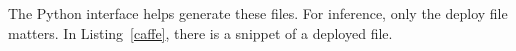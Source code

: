 The Python interface helps generate these files. For inference, only the
deploy file matters. In Listing~\ref{caffe}, there is a snippet of a deployed file. 


